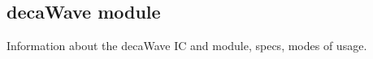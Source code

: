 \subsection{decaWave module}

Information about the decaWave IC and module, specs, modes of usage.

